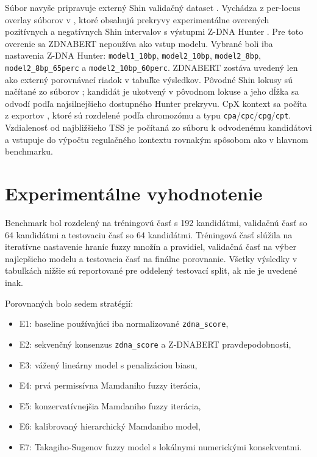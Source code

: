 \documentclass[12pt,a4paper]{article}
\begin{document}
Súbor  navyše pripravuje externý Shin validačný dataset . Vychádza z per-locus overlay súborov v , ktoré obsahujú prekryvy experimentálne overených pozitívnych a negatívnych Shin intervalov s výstupmi Z-DNA Hunter \citep{shin2016}. Pre toto overenie sa ZDNABERT nepoužíva ako vstup modelu. Vybrané boli iba nastavenia Z-DNA Hunter: \texttt{model1\_10bp}, \texttt{model2\_10bp}, \texttt{model2\_8bp}, \texttt{model2\_8bp\_65perc} a \texttt{model2\_10bp\_60perc}. ZDNABERT zostáva uvedený len ako externý porovnávací riadok v tabuľke výsledkov. Pôvodné Shin lokusy sú načítané zo súborov ; kandidát je ukotvený v pôvodnom lokuse a jeho dĺžka sa odvodí podľa najsilnejšieho dostupného Hunter prekryvu. CpX kontext sa počíta z exportov , ktoré sú rozdelené podľa chromozómu a typu \texttt{cpa}/\texttt{cpc}/\texttt{cpg}/\texttt{cpt}. Vzdialenosť od najbližšieho TSS je počítaná zo súboru  k odvodenému kandidátovi a vstupuje do výpočtu regulačného kontextu rovnakým spôsobom ako v hlavnom benchmarku.

\section{Experimentálne vyhodnotenie}

Benchmark bol rozdelený na tréningovú časť s 192 kandidátmi, validačnú časť so 64 kandidátmi a testovaciu časť so 64 kandidátmi. Tréningová časť slúžila na iteratívne nastavenie hraníc fuzzy množín a pravidiel, validačná časť na výber najlepšieho modelu a testovacia časť na finálne porovnanie. Všetky výsledky v tabuľkách nižšie sú reportované pre oddelený testovací split, ak nie je uvedené inak.

Porovnaných bolo sedem stratégií:

\begin{itemize}
  \item E1: baseline používajúci iba normalizované \texttt{zdna\_score},
  \item E2: sekvenčný konsenzus \texttt{zdna\_score} a Z-DNABERT pravdepodobnosti,
  \item E3: vážený lineárny model s penalizáciou biasu,
  \item E4: prvá permissívna Mamdaniho fuzzy iterácia,
  \item E5: konzervatívnejšia Mamdaniho fuzzy iterácia,
  \item E6: kalibrovaný hierarchický Mamdaniho model,
  \item E7: Takagiho-Sugenov fuzzy model s lokálnymi numerickými konsekventmi.
\end{itemize}
\end{document}
